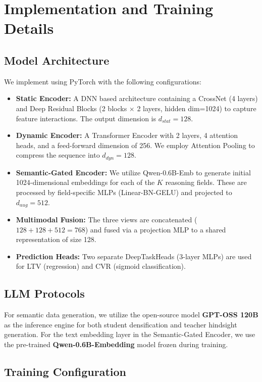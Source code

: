\section{Implementation and Training Details}
\label{app:implementation}

\subsection{Model Architecture}
\label{app:model_architecture}

We implement \modelname{} using PyTorch with the following configurations:
\begin{itemize}
    \item \textbf{Static Encoder:} A DNN based architecture containing a CrossNet (4 layers) and Deep Residual Blocks (2 blocks $\times$ 2 layers, hidden dim=1024) to capture feature interactions. The output dimension is $d_{stat}=128$.
    \item \textbf{Dynamic Encoder:} A Transformer Encoder with 2 layers, 4 attention heads, and a feed-forward dimension of 256. We employ Attention Pooling to compress the sequence into $d_{dyn}=128$.
    \item \textbf{Semantic-Gated Encoder:} We utilize Qwen-0.6B-Emb to generate initial 1024-dimensional embeddings for each of the $K$ reasoning fields. These are processed by field-specific MLPs (Linear-BN-GELU) and projected to $d_{aug}=512$.
    \item \textbf{Multimodal Fusion:} The three views are concatenated ($128+128+512=768$) and fused via a projection MLP to a shared representation of size 128.
    \item \textbf{Prediction Heads:} Two separate DeepTaskHeads (3-layer MLPs) are used for LTV (regression) and CVR (sigmoid classification).
\end{itemize}

\subsection{LLM Protocols}
\label{app:llm_protocols}

For semantic data generation, we utilize the open-source model \textbf{GPT-OSS 120B} as the inference engine for both student densification and teacher hindsight generation. For the text embedding layer in the Semantic-Gated Encoder, we use the pre-trained \textbf{Qwen-0.6B-Embedding} model frozen during training.

\subsection{Training Configuration}
\label{app:training_config}

